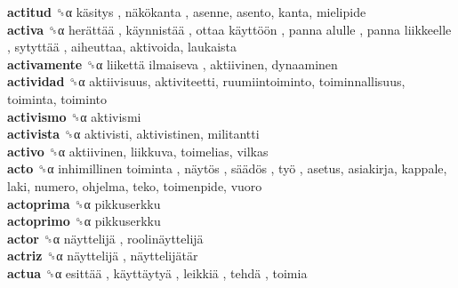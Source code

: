 \textbf{actitud} ␝α   käsitys ,  näkökanta , asenne, asento, kanta, mielipide  \\
\textbf{activa} ␝α   herättää ,  käynnistää ,  ottaa käyttöön ,  panna alulle ,  panna liikkeelle ,  sytyttää , aiheuttaa, aktivoida, laukaista  \\
\textbf{activamente} ␝α   liikettä ilmaiseva , aktiivinen, dynaaminen  \\
\textbf{actividad} ␝α  aktiivisuus, aktiviteetti, ruumiintoiminto, toiminnallisuus, toiminta, toiminto  \\
\textbf{activismo} ␝α  aktivismi  \\
\textbf{activista} ␝α  aktivisti, aktivistinen, militantti  \\
\textbf{activo} ␝α  aktiivinen, liikkuva, toimelias, vilkas  \\
\textbf{acto} ␝α   inhimillinen toiminta ,  näytös ,  säädös ,  työ , asetus, asiakirja, kappale, laki, numero, ohjelma, teko, toimenpide, vuoro  \\
\textbf{actoprima} ␝α  pikkuserkku  \\
\textbf{actoprimo} ␝α  pikkuserkku  \\
\textbf{actor} ␝α   näyttelijä ,  roolinäyttelijä   \\
\textbf{actriz} ␝α   näyttelijä ,  näyttelijätär   \\
\textbf{actua} ␝α   esittää ,  käyttäytyä ,  leikkiä ,  tehdä , toimia  \\
